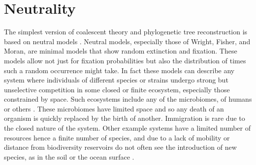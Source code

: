 



\section{Neutrality}
The simplest version of coalescent theory and phylogenetic tree reconstruction is based on neutral models \cite{Kingman1982,Rice2004}. 
Neutral models, especially those of Wright, Fisher, and Moran, are minimal models that show random extinction and fixation. 
These models allow not just for fixation probabilities but also the distribution of times such a random occurrence might take. 
In fact these models can describe any system where individuals of different species or strains undergo strong but unselective competition in some closed or finite ecosystem, especially those constrained by space. 
Such ecosystems include any of the microbiomes, of humans \cite{Coburn2015,Kinross2011} or others \cite{Theriot2014,Wolfe2014,Roeselers2011,Ofiteru2010,Bucci2011,Vega2017}. These microbiomes have limited space and so any death of an organism is quickly replaced by the birth of another. Immigration is rare due to the closed nature of the system. 
Other example systems have a limited number of resources hence a finite number of species, and due to a lack of mobility or distance from biodiversity reservoirs do not often see the introduction of new species, as in the soil or the ocean surface \cite{Friedman2017,Cordero2016}. 

